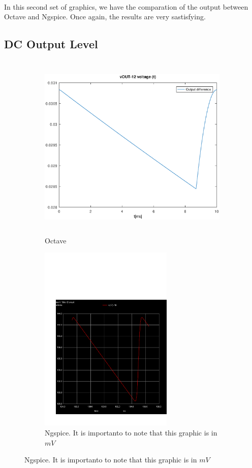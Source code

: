 \paragraph{}
In this second set of graphics, we have the comparation of the output between Octave and Ngspice. Once again, the results are very sastisfying.

\subsection{DC Output Level}
\label{subsec:third_topic_error}


\begin{figure}[H]

\begin{subfigure}{0.5\textwidth}
\includegraphics[width=1.1\linewidth, height=9cm]{outputdiff.eps} 
\caption{Octave}
\label{fig:theothirdcompare}
\end{subfigure}
\begin{subfigure}{0.5\textwidth}
\includegraphics[trim= 0cm 0cm 0cm 10cm, clip, width=1.1\linewidth, height=9cm]{trans3aux.pdf}
\caption{Ngspice. It is importanto to note that this graphic is in $mV$}
\label{fig:simthirdcompare}
\end{subfigure}

\label{fig:compar3}
\end{figure}

